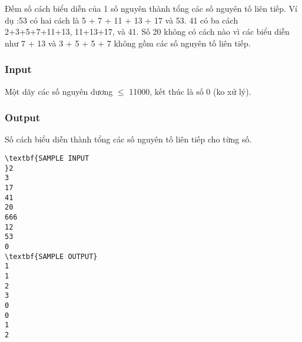 

Đếm số cách biểu diễn của 1 số nguyên thành tổng các số nguyên tố liên tiếp. Ví dụ :53 có hai cách là 5 + 7 + 11 + 13 + 17 và 53. 41 có ba cách 2+3+5+7+11+13, 11+13+17, và 41. Số 20 không có cách nào vì các biểu diễn như 7 + 13 và 3 + 5 + 5 + 7 không gồm các số nguyên tố liên tiếp.

\subsubsection{Input}

Một dãy các số nguyên dương  $\le$  11000, kết thúc là số 0 (ko xử lý).

\subsubsection{Output}

Số cách biểu diễn thành tổng các số nguyên tố liên tiếp cho từng số.
\begin{verbatim}
\textbf{SAMPLE INPUT
}2
3
17
41
20
666
12
53
0
\textbf{SAMPLE OUTPUT}
1
1
2
3
0
0
1
2
\end{verbatim}
